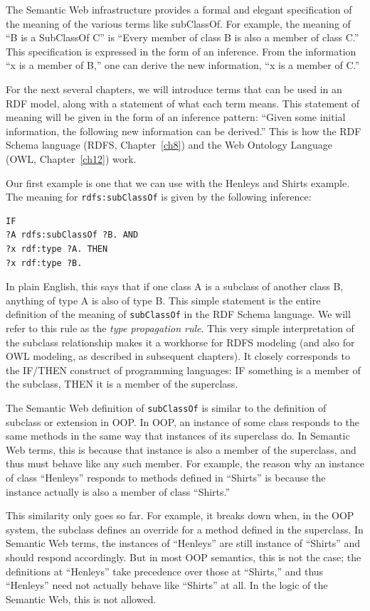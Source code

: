 The Semantic Web infrastructure provides a formal and elegant
specification of the meaning of the various terms like subClassOf. For
example, the meaning of ``B is a SubClassOf C'' is ``Every member of
class B is also a member of class C.'' This specification is expressed
in the form of an inference. From the information ``x is a member of
B,'' one can derive the new information, ``x is a member of C.''

For the next several chapters, we will introduce terms that can be used
in an RDF model, along with a statement of what each term means. This
statement of meaning will be given in the form of an inference pattern:
``Given some initial information, the following new information can be
derived.'' This is how the RDF Schema language (RDFS, Chapter~\ref{ch8}) and the
Web Ontology Language (OWL, Chapter~\ref{ch12}) work.

Our first example is one that we can use with the Henleys and Shirts
example. The meaning for
\texttt{rdfs:subClassOf} is given by the following inference:

\begin{lstlisting}
IF
?A rdfs:subClassOf ?B. AND
?x rdf:type ?A. THEN
?x rdf:type ?B.
\end{lstlisting}

In plain English, this says that if one class A is a subclass of another
class B, anything of type A is also of type B. This simple statement is
the entire definition of the meaning of \texttt{subClassOf} in the RDF Schema
language. We will refer to this rule as the \emph{type propagation
rule}. This very simple interpretation of the subclass relationship
makes it a workhorse for RDFS modeling (and also for OWL modeling, as
described in subsequent chapters). It closely corresponds to the IF/THEN
construct of programming languages: IF something is a member of the
subclass, THEN it is a member of the superclass.

\begin{sidebar}{}
The Semantic Web definition of \texttt{subClassOf} is similar to the definition
of subclass or extension in OOP. In OOP, an instance of some class
responds to the same methods in the same way that instances of its
superclass do. In Semantic Web terms, this is because that instance is
also a member of the superclass, and thus must behave like any such
member. For example, the reason why an instance of class ``Henleys''
responds to methods defined in ``Shirts'' is because the instance
actually is also a member of class ``Shirts.''

This similarity only goes so far. For example, it breaks down when, in
the OOP system, the subclass defines an override for a method defined in
the superclass. In Semantic Web terms, the instances of ``Henleys'' are
still instance of ``Shirts'' and should respond accordingly. But in most
OOP semantics, this is not the case; the definitions at ``Henleys'' take
precedence over those at ``Shirts,'' and thus ``Henleys'' need not
actually behave like ``Shirts'' at all. In the logic of the Semantic
Web, this is not allowed.
\end{sidebar}

